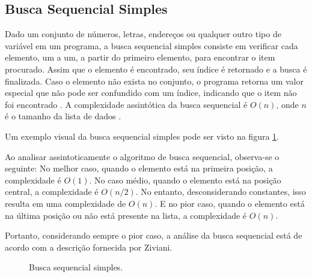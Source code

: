 \documentclass[12pt]{article}
\begin{document}
    
\subsection{Busca Sequencial Simples}

    Dado um conjunto de números, letras, endereços ou qualquer outro tipo de variável em um programa, a busca sequencial simples consiste em verificar cada elemento, um a um, a partir do primeiro elemento, para encontrar o item procurado. Assim que o elemento é encontrado, seu índice é retornado e a busca é finalizada. Caso o elemento não exista no conjunto, o programa retorna um valor especial que não pode ser confundido com um índice, indicando que o item não foi encontrado \cite{ziviani:1999}.  A complexidade assintótica da busca sequencial é \(O(n)\), onde \(n\) é o tamanho da lista de dados \cite{ziviani:1999}.

    Um exemplo visual da busca sequencial simples pode ser visto na figura \ref{fig:busca_sequencial_simples}.

    Ao analisar assintoticamente o algoritmo de busca sequencial, observa-se o seguinte: No melhor caso, quando o elemento está na primeira posição, a complexidade é \(O(1)\). No caso médio, quando o elemento está na posição central, a complexidade é \(O(n/2)\). No entanto, desconsiderando constantes, isso resulta em uma complexidade de \(O(n)\). E no pior caso, quando o elemento está na última posição ou não está presente na lista, a complexidade é \(O(n)\).
    
    Portanto, considerando sempre o pior caso, a análise da busca sequencial está de acordo com a descrição fornecida por Ziviani.


    \begin{figure}[h]
      \centering
      \caption{Busca sequencial simples.}
      \label{fig:busca_sequencial_simples}
    \end{figure}
\end{document}
